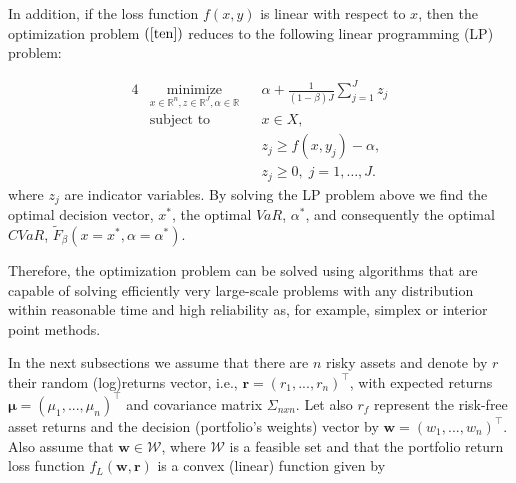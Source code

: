 \documentclass[a4paper,10pt]{article}
\begin{document}
In addition, if the loss function $f(x,y)$ is linear with respect to
\thinspace $x$, then the optimization problem $\left( \ref{ten}\right) $
reduces to the following linear programming (LP) problem:%

\begin{alignat}{4}
& \underset{x \in \mathbb{R}^{n},z\in 	\mathbb{R}^{J},\alpha \in \mathbb{R}}{\text{minimize}}
& & \alpha +\frac{1}{\left( 1-\beta \right)  J}\sum_{j=1}^{J}z_{j}
\\ 
& \text{subject to} 
& & x\in X,\\
&&& z_{j}\geq f(x,y_{j})-\alpha , \\
&&& z_{j}\geq 0, \; j = 1, \ldots, J.
\end{alignat}
where $z_{j}$ are indicator variables. By solving the LP problem above we
find the optimal decision vector, $x^{\ast }$, the optimal $VaR$, $\alpha
^{\ast }$, and consequently the optimal $CVaR$, $\widetilde{F}_{\beta
}\left( x=x^{\ast },\alpha=\alpha ^{\ast }\right) $.

Therefore, the optimization problem can be solved using algorithms that are
capable of solving efficiently very large-scale problems with any
distribution within reasonable time and high reliability as, for example,
simplex or interior point methods.

In the next subsections we assume that there are $n$ risky assets and denote
by $r$ their random (log)returns vector, i.e., $\mathbf{r}\mathbf{=}\left(
r_{1},...,r_{n}\right) ^{\top }$, with expected returns $\mathbf{\mu }%
\mathbf{=}\left( \mu _{1},...,\mu _{n}\right) ^{\top }$ and covariance
matrix $\Sigma _{nxn}$. Let also $r_{f}$ represent the risk-free asset
returns and the decision (portfolio's weights) vector by $\mathbf{w}\mathbf{=%
}\left( w_{1},...,w_{n}\right) ^{\top }$. Also assume that $\mathbf{w}\in
\mathcal{W}$, where $\mathcal{W}$ is a feasible set and that the portfolio
return loss function $f_{L}\left( \mathbf{w,r}\right) $ is a convex (linear)
function given by
\end{document}

